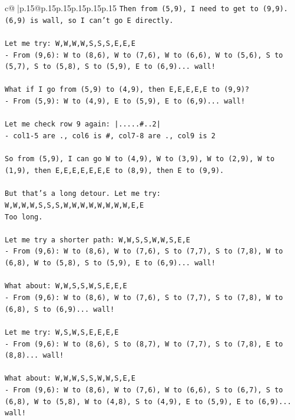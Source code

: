 \documentclass{article}
\begin{document}
{\begin{supertabular}{c@{$\;$}|p{.15\linewidth}@{}p{.15\linewidth}p{.15\linewidth}p{.15\linewidth}p{.15\linewidth}p{.15\linewidth}}
{{{\texttt{Then from (5,9), I need to get to (9,9). (6,9) is wall, so I can't go E directly.} \\
\\ 
\texttt{Let me try: W,W,W,W,S,S,S,E,E,E} \\
\texttt{{-} From (9,6): W to (8,6), W to (7,6), W to (6,6), W to (5,6), S to (5,7), S to (5,8), S to (5,9), E to (6,9)... wall!} \\
\\ 
\texttt{What if I go from (5,9) to (4,9), then E,E,E,E,E to (9,9)?} \\
\texttt{{-} From (5,9): W to (4,9), E to (5,9), E to (6,9)... wall!} \\
\\ 
\texttt{Let me check row 9 again: |.....\#..2|} \\
\texttt{{-} col1{-}5 are ., col6 is \#, col7{-}8 are ., col9 is 2} \\
\\ 
\texttt{So from (5,9), I can go W to (4,9), W to (3,9), W to (2,9), W to (1,9), then E,E,E,E,E,E,E to (8,9), then E to (9,9).} \\
\\ 
\texttt{But that's a long detour. Let me try: W,W,W,W,S,S,S,W,W,W,W,W,W,W,W,E,E} \\
\texttt{Too long.} \\
\\ 
\texttt{Let me try a shorter path: W,W,S,S,W,W,S,E,E} \\
\texttt{{-} From (9,6): W to (8,6), W to (7,6), S to (7,7), S to (7,8), W to (6,8), W to (5,8), S to (5,9), E to (6,9)... wall!} \\
\\ 
\texttt{What about: W,W,S,S,W,S,E,E,E} \\
\texttt{{-} From (9,6): W to (8,6), W to (7,6), S to (7,7), S to (7,8), W to (6,8), S to (6,9)... wall!} \\
\\ 
\texttt{Let me try: W,S,W,S,E,E,E,E} \\
\texttt{{-} From (9,6): W to (8,6), S to (8,7), W to (7,7), S to (7,8), E to (8,8)... wall!} \\
\\ 
\texttt{What about: W,W,W,S,S,W,W,S,E,E} \\
\texttt{{-} From (9,6): W to (8,6), W to (7,6), W to (6,6), S to (6,7), S to (6,8), W to (5,8), W to (4,8), S to (4,9), E to (5,9), E to (6,9)... wall!} \\
\\ 
}}}
\end{supertabular}}
\end{document}
